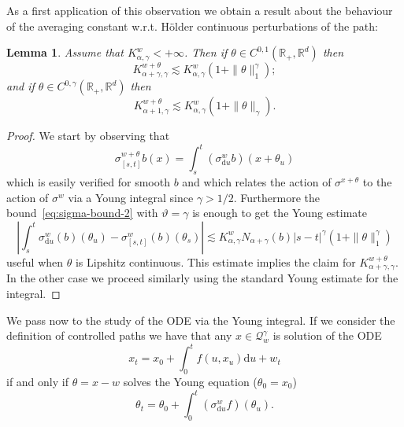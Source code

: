 \documentclass[11pt,a4paper,draft,reqno]{amsart}
\newtheorem{lemma}{Lemma}
\theoremstyle{definition}
\newcommand{\RR}{\mathbb{R}}
\newcommand{\dd}{\mathrm{d}}
\newcommand{\cQ}{\mathcal{Q}}
\begin{document}
As a first application of this observation  we obtain a result about the behaviour of the averaging constant w.r.t. H\"older continuous perturbations of the path:

\begin{lemma}
\label{lemma:averaging-perturbation-basic}
Assume that $K^w_{\alpha,\gamma}<+\infty$. Then if $\theta \in C^{0,1}(\RR_+,\RR^d)$ then $$K^{w+\theta}_{\alpha+\gamma,\gamma} \lesssim K^w_{\alpha,\gamma}(1+\|\theta\|_1^\gamma) ;$$ and if $\theta \in C^{0,\gamma}(\RR_+,\RR^d)$ then 
$$K^{w+\theta}_{\alpha+1,\gamma} \lesssim K^w_{\alpha,\gamma}(1+\|\theta\|_\gamma) .$$
\end{lemma}
\begin{proof}
We start by observing that 
$$
 \sigma^{w+\theta}_{[s,t]} b (x) = \int_s^t (\sigma^{w}_{\dd u} b) (x+\theta_u)
$$
which is easily verified for smooth $b$ and which relates the action of $\sigma^{x+\theta}$ to the action of $\sigma^w$ via a Young integral since $\gamma > 1/2$. Furthermore  the bound~\eqref{eq:sigma-bound-2} with $\vartheta=\gamma$ is enough to get the  Young estimate
\begin{equation*}
\left|\int_s^t \sigma^{w}_{\dd u}(b)(\theta_u)-\sigma^w_{[s,t]}(b)(\theta_s)\right| \lesssim K^w_{\alpha,\gamma} N_{\alpha+\gamma}(b) |s-t|^\gamma\left(1+ \|\theta\|_1^\gamma\right)
\end{equation*}
useful when $\theta$ is Lipshitz continuous. This estimate implies the claim for $K^{w+\theta}_{\alpha+\gamma,\gamma}$. In the other case we proceed similarly using the standard Young estimate for the integral.
\end{proof}



\bigskip
We pass now to the study of the ODE via the Young integral.
If we  consider the definition of controlled paths
we have that any $x\in \cQ^{\gamma}_w$  is solution of the ODE
$$
x_t = x_0 + \int_0^t f(u,x_u)\dd u + w_t
$$
if and only if $\theta = x - w$ solves the Young equation ($\theta_0 = x_0$) 
\begin{equation}
\label{eq:young-sigma}
\theta_t = \theta_0 + \int_0^t\left(\sigma^w_{\dd u}f\right)(\theta_u) .
\end{equation}
\end{document}
